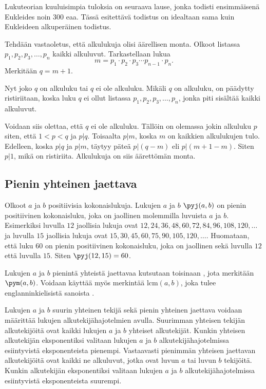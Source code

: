 Lukuteorian kuuluisimpia tuloksia on seuraava lause, jonka todisti ensimmäisenä Eukleides noin 300 eaa. Tässä esitettävä todistus on idealtaan sama kuin Eukleideen alkuperäinen todistus.


\begin{todistus}
Tehdään vastaoletus, että alkulukuja olisi äärellisen monta. Olkoot listassa
$p_1,p_2,p_3,\ldots,p_n$ kaikki alkuluvut. Tarkastellaan lukua
\[
m = p_1\cdot p_2\cdot p_3 \cdots p_{n-1}\cdot p_n.
\]
Merkitään $q=m+1$.

Nyt joko $q$ on alkuluku tai $q$ ei ole alkuluku. Mikäli $q$ on alkuluku, on päädytty ristiriitaan, koska luku $q$ ei ollut listassa $p_1,p_2,p_3,\ldots,p_n$, jonka piti sisältää kaikki alkuluvut.

Voidaan siis olettaa, että $q$ ei ole alkuluku. Tällöin on olemassa jokin alkuluku $p$ siten, että $1<p<q$ ja $p|q$. Toisaalta $p|m$, koska $m$ on kaikkien alkulukujen tulo. Edelleen, koska $p|q$ ja $p|m$, täytyy päteä $p|(q-m)$ eli $p|(m+1-m)$. Siten $p|1$, mikä on ristiriita. Alkulukuja on siis äärettömän monta.
\end{todistus}


\subsection*{Pienin yhteinen jaettava}
Olkoot $a$ ja $b$ positiivisia kokonaislukuja. Lukujen $a$ ja $b$  $\pyj(a,b)$ on pienin positiivinen kokonaisluku, joka on jaollinen molemmilla luvuista $a$ ja $b$. Esimerkiksi luvulla $12$ jaollisia lukuja ovat $12, 24, 36, 48, 60, 72, 84, 96, 108, 120, \ldots$ ja luvulla $15$ jaollisia lukuja ovat $15, 30, 45, 60, 75, 90, 105, 120, \ldots$. Huomataan, että luku $60$ on pienin positiivinen kokonaisluku, joka on jaollinen sekä luvulla $12$ että luvulla $15$. Siten $\pyj(12, 15) = 60$.

Lukujen $a$ ja $b$ pienintä yhteistä jaettavaa kutsutaan toisinaan , jota merkitään $\pym(a,b)$. Voidaan käyttää myös merkintää $\mathrm{lcm}(a,b)$, joka tulee englanninkielisistä sanoista .

Lukujen $a$ ja $b$ suurin yhteinen tekijä sekä pienin yhteinen jaettava voidaan määrittää lukujen alkutekijähajotelmien avulla. Suurimman yhteisen tekijän alkutekijöitä ovat kaikki lukujen $a$ ja $b$ yhteiset alkutekijät. Kunkin yhteisen alkutekijän eksponentiksi valitaan lukujen $a$ ja $b$ alkutekijähajotelmissa esiintyvistä eksponenteista pienempi. Vastaavasti pienimmän yhteisen jaettavan alkutekijöitä ovat kaikki ne alkuluvut, jotka ovat luvun $a$ tai luvun $b$ tekijöitä. Kunkin alkutekijän eksponentiksi valitaan lukujen $a$ ja $b$ alkutekijähajotelmissa esiintyvistä eksponenteista suurempi.

